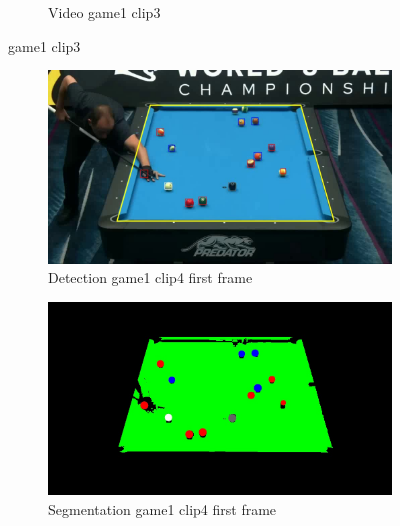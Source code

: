 \begin{figure}[H]
\begin{subfigure}[b]{0.48\textwidth}
    	\caption{Video game1 clip3}
    	\label{fig: game1_clip3_video}
    \end{subfigure}
    
	\caption{game1 clip3}
\end{figure}

\begin{figure}[H]
    \centering
    \begin{subfigure}[b]{0.48\textwidth}
        \centering
        \includegraphics[width=\textwidth]{images/Detection/game1_clip4_detected_balls_first_frame.jpg}
        \caption{Detection game1 clip4 first frame}
        \label{fig: game1_clip4_first_frame_detected}
    \end{subfigure}
    \begin{subfigure}[b]{0.48\textwidth}
        \centering
        \includegraphics[width=\textwidth]{images/Segmentation/game1_clip4_segmented_balls_first_frame.jpg}
        \caption{Segmentation game1 clip4 first frame}
		\label{fig: game1_clip4_first_frame_segmented}
    \end{subfigure}
    \begin{subfigure}[b]{0.48\textwidth}

\end{subfigure}
\end{figure}
